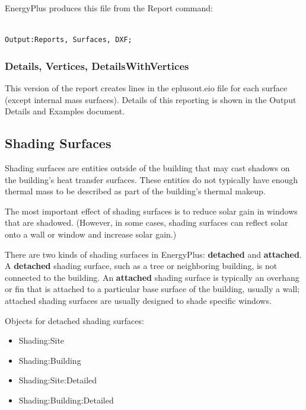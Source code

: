 EnergyPlus produces this file from the Report command:

\begin{lstlisting}

Output:Reports, Surfaces, DXF;
\end{lstlisting}

\subsubsection{Details, Vertices, DetailsWithVertices}\label{details-vertices-detailswithvertices}

This version of the report creates lines in the eplusout.eio file for each surface (except internal mass surfaces). Details of this reporting is shown in the Output Details and Examples document.

\subsection{Shading Surfaces}\label{shading-surfaces}

Shading surfaces are entities outside of the building that may cast shadows on the building's heat transfer surfaces. These entities do not typically have enough thermal mass to be described as part of the building's thermal makeup.

The most important effect of shading surfaces is to reduce solar gain in windows that are shadowed. (However, in some cases, shading surfaces can reflect solar onto a wall or window and increase solar gain.)

There are two kinds of shading surfaces in EnergyPlus: \textbf{detached} and \textbf{attached}. A \textbf{detached} shading surface, such as a tree or neighboring building, is not connected to the building. An \textbf{attached} shading surface is typically an overhang or fin that is attached to a particular base surface of the building, usually a wall; attached shading surfaces are usually designed to shade specific windows.

Objects for detached shading surfaces:

\begin{itemize}
\item
  Shading:Site
\item
  Shading:Building
\item
  Shading:Site:Detailed
\item
  Shading:Building:Detailed
\end{itemize}


